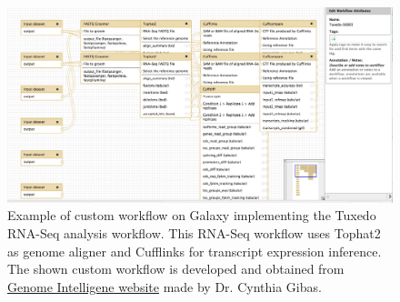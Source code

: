 \begin{figure}[!htbp]
\centering
\includegraphics[width=1\textwidth]{images/galaxy_workflow}
\caption[Example of custom workflow on Galaxy]{
    Example of custom workflow on Galaxy implementing the Tuxedo RNA-Seq
    analysis workflow. This RNA-Seq workflow uses Tophat2 as genome aligner and
    Cufflinks for transcript expression inference. The shown custom workflow is
    developed and obtained from
        \href{http://genomeintelligence.org/?p=561}
        {Genome Intelligene website}
    made by Dr. Cynthia Gibas.
}
\label{fig:galaxy-workflow}
\end{figure}


